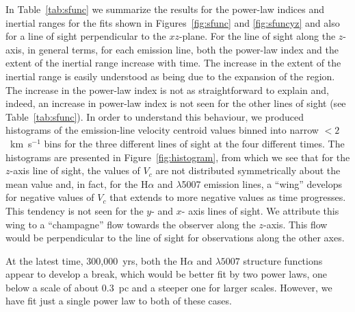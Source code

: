 \documentclass[useAMS,usenatbib]{mn2e}
\begin{document}
In Table~\ref{tab:sfunc} we summarize the results for the power-law
indices and inertial ranges for the fits shown in 
Figures~\ref{fig:sfunc} and \ref{fig:sfuncyz} and also for a line of sight perpendicular to
the $xz$-plane. For
the line of sight along the $z$-axis, in
general terms, for each emission line, both the power-law index and
the extent of the inertial range increase with time. The increase in
the extent of the inertial range is easily understood as being due to
the expansion of the \hii{} region. The increase in the power-law index
is not as straightforward to explain and, indeed, an increase in
power-law index is not seen for the other lines of sight (see Table~\ref{tab:sfunc}). In order to
understand this behaviour, we produced histograms of the emission-line
velocity centroid values binned into narrow $<2$~km~s$^{-1}$ bins for the three
different lines of sight at the four different times. The histograms
are presented in Figure~\ref{fig:histogram}, from which we see that
for the $z$-axis line of sight, the values of $V_c$ are not
distributed symmetrically about the mean value and, in fact, for the
H$\alpha$ and \oiii$\lambda$5007 emission lines, a
``wing'' develops for negative values of $V_c$ that extends to more
negative values as time progresses. This tendency is not seen for the
$y$- and $x$- axis lines of sight. We attribute this wing to a
``champagne'' flow towards the observer along the $z$-axis. This flow
would be perpendicular to the line of sight for observations along the
other axes.

At the latest time, 300,000~yrs, both the H$\alpha$
and \oiii$\lambda 5007$ structure functions appear to develop a
break, which would be better fit by two power
laws, one below a scale of about 0.3~pc and a steeper one for larger
scales. However, we have fit just a single power law to both of these
cases.
\end{document}

